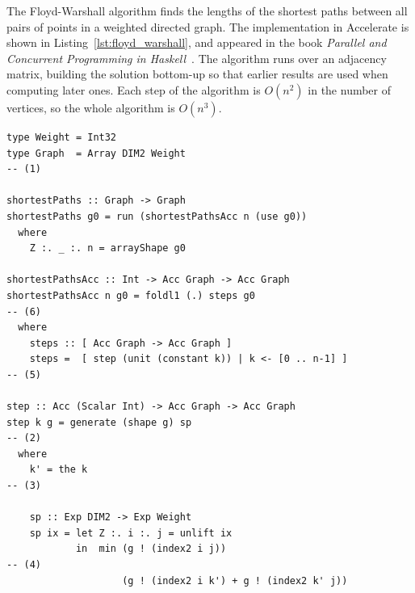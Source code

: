 The Floyd-Warshall algorithm finds the lengths of the shortest paths between all
pairs of points in a weighted directed graph. The implementation in Accelerate
is shown in Listing~\ref{lst:floyd_warshall}, and appeared in the book
\emph{Parallel and Concurrent Programming in Haskell}~\cite{Marlow:2013wn}. The
algorithm runs over an adjacency matrix, building the solution bottom-up so that
earlier results are used when computing later ones. Each step of the algorithm
is $O\left(n^2\right)$ in the number of vertices, so the whole algorithm is
$O\left(n^3\right)$.

\begin{lstlisting}[style=haskell_float
    ,label=lst:floyd_warshall
    ,caption={[Floyd-Warshall shortest-paths algorithm in Accelerate]
        Floyd-Warshall shortest-paths algorithm in Accelerate~\cite{Marlow:2013wn}}]
type Weight = Int32
type Graph  = Array DIM2 Weight                                                        -- (1)

shortestPaths :: Graph -> Graph
shortestPaths g0 = run (shortestPathsAcc n (use g0))
  where
    Z :. _ :. n = arrayShape g0

shortestPathsAcc :: Int -> Acc Graph -> Acc Graph
shortestPathsAcc n g0 = foldl1 (.) steps g0                                            -- (6)
  where
    steps :: [ Acc Graph -> Acc Graph ]
    steps =  [ step (unit (constant k)) | k <- [0 .. n-1] ]                            -- (5)

step :: Acc (Scalar Int) -> Acc Graph -> Acc Graph
step k g = generate (shape g) sp                                                       -- (2)
  where
    k' = the k                                                                         -- (3)

    sp :: Exp DIM2 -> Exp Weight
    sp ix = let Z :. i :. j = unlift ix
            in  min (g ! (index2 i j))                                                 -- (4)
                    (g ! (index2 i k') + g ! (index2 k' j))
\end{lstlisting}

